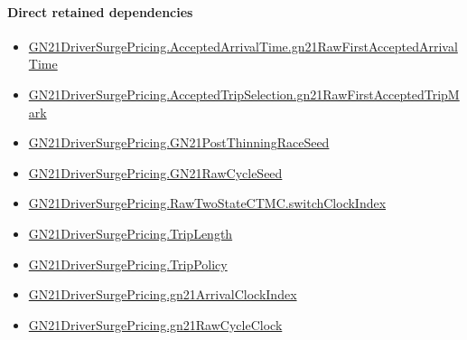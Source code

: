\documentclass[10pt]{article}
\begin{document}
\paragraph{Direct retained dependencies}
\begin{itemize}\raggedright
\item \hyperlink{governing-declaration-92537a78afcc276d}{GN21\allowbreak{}Driver\allowbreak{}Surge\allowbreak{}Pricing.\allowbreak{}Accepted\allowbreak{}Arrival\allowbreak{}Time.\allowbreak{}gn21\allowbreak{}Raw\allowbreak{}First\allowbreak{}Accepted\allowbreak{}Arrival\allowbreak{}Time}
\item \hyperlink{governing-declaration-bb4c681d55024b52}{GN21\allowbreak{}Driver\allowbreak{}Surge\allowbreak{}Pricing.\allowbreak{}Accepted\allowbreak{}Trip\allowbreak{}Selection.\allowbreak{}gn21\allowbreak{}Raw\allowbreak{}First\allowbreak{}Accepted\allowbreak{}Trip\allowbreak{}Mark}
\item \hyperlink{governing-declaration-084a2abe27ae9f7c}{GN21\allowbreak{}Driver\allowbreak{}Surge\allowbreak{}Pricing.\allowbreak{}GN21\allowbreak{}Post\allowbreak{}Thinning\allowbreak{}Race\allowbreak{}Seed}
\item \hyperlink{governing-declaration-228de34d5811f602}{GN21\allowbreak{}Driver\allowbreak{}Surge\allowbreak{}Pricing.\allowbreak{}GN21\allowbreak{}Raw\allowbreak{}Cycle\allowbreak{}Seed}
\item \hyperlink{governing-declaration-ed4fcd80c5bb596a}{GN21\allowbreak{}Driver\allowbreak{}Surge\allowbreak{}Pricing.\allowbreak{}Raw\allowbreak{}Two\allowbreak{}State\allowbreak{}CTMC.\allowbreak{}switch\allowbreak{}Clock\allowbreak{}Index}
\item \hyperlink{governing-declaration-a616c143f22cf2bc}{GN21\allowbreak{}Driver\allowbreak{}Surge\allowbreak{}Pricing.\allowbreak{}Trip\allowbreak{}Length}
\item \hyperlink{governing-declaration-4312ad4cb899871f}{GN21\allowbreak{}Driver\allowbreak{}Surge\allowbreak{}Pricing.\allowbreak{}Trip\allowbreak{}Policy}
\item \hyperlink{governing-declaration-39ede0799048e733}{GN21\allowbreak{}Driver\allowbreak{}Surge\allowbreak{}Pricing.\allowbreak{}gn21\allowbreak{}Arrival\allowbreak{}Clock\allowbreak{}Index}
\item \hyperlink{governing-declaration-f92863a6b3b23692}{GN21\allowbreak{}Driver\allowbreak{}Surge\allowbreak{}Pricing.\allowbreak{}gn21\allowbreak{}Raw\allowbreak{}Cycle\allowbreak{}Clock}
\end{itemize}
\hypertarget{governing-declaration-5c163deff781ebca}{}
\end{document}
